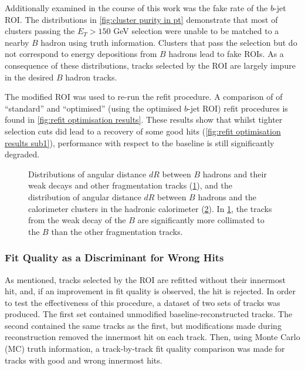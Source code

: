 Additionally examined in the course of this work was the fake rate of the $b$-jet ROI. The distributions in \cref{fig:cluster purity in pt} demonstrate that most of clusters passing the $E_T > 150$ GeV selection were unable to be matched to a nearby $B$ hadron using truth information. Clusters that pass the selection but do not correspond to energy depositions from $B$ hadrons lead to fake ROIs. As a consequence of these distributions, tracks selected by the ROI are largely impure in the desired $B$ hadron tracks.

The modified ROI was used to re-run the refit procedure. A comparison of of ``standard'' and ``optimised'' (using the optimised $b$-jet ROI) refit procedures is found in \cref{fig:refit optimisation results}. These results show that whilst tighter selection cuts did lead to a recovery of some good hits (\cref{fig:refit optimisation results sub1}), performance with respect to the baseline is still significantly degraded. 

%
\begin{figure}[!htbp]
    \centering
    \begin{subfigure}{.4\textwidth}
      \centering
      \caption{}
      \label{fig:B dR match sub1}
    \end{subfigure}%
    \begin{subfigure}{.4\textwidth}
      \centering
      \caption{}
      \label{fig:B dR match sub2}
    \end{subfigure}
    \caption{Distributions of angular distance $dR$ between $B$ hadrons and their weak decays and other fragmentation tracks (\cref{fig:B dR match sub1}), and the distribution of angular distance $dR$ between $B$ hadrons and the calorimeter clusters in the hadronic calorimeter (\cref{fig:B dR match sub2}). In \cref{fig:B dR match sub1}, the tracks from the weak decay of the $B$ are significantly more collimated to the $B$ than the other fragmentation tracks.}
    \label{fig:B dR match}
\end{figure}
%

\subsubsection{Fit Quality as a Discriminant for Wrong Hits}
As mentioned, tracks selected by the ROI are refitted without their innermost hit, and, if an improvement in fit quality is observed, the hit is rejected. In order to test the effectiveness of this procedure, a dataset of two sets of tracks was produced. The first set contained unmodified baseline-reconstructed tracks. The second contained the same tracks as the first, but modifications made during reconstruction removed the innermost hit on each track. Then, using Monte Carlo (MC) truth information, a track-by-track fit quality comparison was made for tracks with good and wrong innermost hits. 

